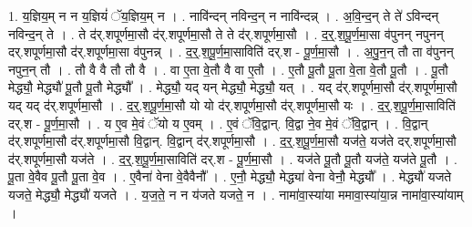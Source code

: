 \documentclass[17pt]{extarticle}
\begin{document}
1. य॒ज्ञिय॒म् न न य॒ज्ञियं॑ ॅय॒ज्ञिय॒म् न । . नावि॑न्दन् नविन्द॒न् न नावि॑न्दन्न् । . अ॒वि॒न्द॒न् ते ते॑ ऽविन्दन् नविन्द॒न् ते । . ते द॑र्.शपूर्णमा॒सौ द॑र्.शपूर्णमा॒सौ ते ते द॑र्.शपूर्णमा॒सौ । . द॒र्॒.श॒पू॒र्ण॒मा॒सा व॑पुनन् नपुनन् दर्.शपूर्णमा॒सौ द॑र्.शपूर्णमा॒सा व॑पुनन्न् । . द॒र्॒.श॒पू॒र्ण॒मा॒साविति॑ दर्.श - पू॒र्ण॒मा॒सौ । . अ॒पु॒न॒न् तौ ता व॑पुनन् नपुन॒न् तौ । . तौ वै वै तौ तौ वै । . वा ए॒ता वे॒तौ वै वा ए॒तौ । . ए॒तौ पू॒तौ पू॒ता वे॒ता वे॒तौ पू॒तौ । . पू॒तौ मेद्ध्यौ॒ मेद्ध्यौ॑ पू॒तौ पू॒तौ मेद्ध्यौ᳚ । . मेद्ध्यौ॒ यद् यन् मेद्ध्यौ॒ मेद्ध्यौ॒ यत् । . यद् द॑र्.शपूर्णमा॒सौ द॑र्.शपूर्णमा॒सौ यद् यद् द॑र्.शपूर्णमा॒सौ । . द॒र्॒.श॒पू॒र्ण॒मा॒सौ यो यो द॑र्.शपूर्णमा॒सौ द॑र्.शपूर्णमा॒सौ यः । . द॒र्॒.श॒पू॒र्ण॒मा॒साविति॑ दर्.श - पू॒र्ण॒मा॒सौ । . य ए॒व मे॒वं ॅयो य ए॒वम् । . ए॒वं ॅवि॒द्वान्. वि॒द्वा ने॒व मे॒वं ॅवि॒द्वान् । . वि॒द्वान् द॑र्.शपूर्णमा॒सौ द॑र्.शपूर्णमा॒सौ वि॒द्वान्. वि॒द्वान् द॑र्.शपूर्णमा॒सौ । . द॒र्॒.श॒पू॒र्ण॒मा॒सौ यज॑ते॒ यज॑ते दर्.शपूर्णमा॒सौ द॑र्.शपूर्णमा॒सौ यज॑ते । . द॒र्॒.श॒पू॒र्ण॒मा॒साविति॑ दर्.श - पू॒र्ण॒मा॒सौ । . यज॑ते पू॒तौ पू॒तौ यज॑ते॒ यज॑ते पू॒तौ । . पू॒ता वे॒वैव पू॒तौ पू॒ता वे॒व । . ए॒वैना॑ वेना वे॒वैवैनौ᳚ । . ए॒नौ॒ मेद्ध्यौ॒ मेद्ध्या॑ वेना वेनौ॒ मेद्ध्यौ᳚ । . मेद्ध्यौ॑ यजते यजते॒ मेद्ध्यौ॒ मेद्ध्यौ॑ यजते । . य॒ज॒ते॒ न न य॑जते यजते॒ न । . नामा॑वा॒स्या॑या ममावा॒स्या॑या॒न्न नामा॑वा॒स्या॑याम् । \newline
\end{document}
